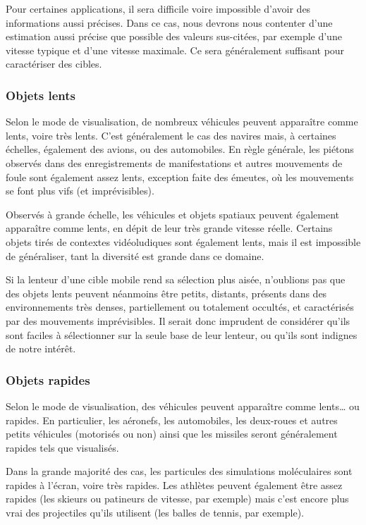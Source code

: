 	Pour certaines applications, il sera difficile voire impossible d'avoir des informations aussi précises. Dans ce cas, nous devrons nous contenter d'une estimation aussi précise que possible des valeurs sus-citées, par exemple d'une vitesse \og typique \fg{} et d'une vitesse maximale. Ce sera généralement suffisant pour caractériser des cibles.
				
	\subsubsection{Objets lents}
	Selon le mode de visualisation, de nombreux véhicules peuvent apparaître comme lents, voire très lents. C'est généralement le cas des navires mais, à certaines échelles, également des avions, ou des automobiles. En règle générale, les piétons observés dans des enregistrements de manifestations et autres mouvements de foule sont également assez lents, exception faite des émeutes, où les mouvements se font plus vifs (et imprévisibles).
	
	Observés à grande échelle, les véhicules et objets spatiaux peuvent également apparaître comme lents, en dépit de leur très grande vitesse réelle. Certains objets tirés de contextes vidéoludiques sont également lents, mais il est impossible de généraliser, tant la diversité est grande dans ce domaine.
	
	Si la lenteur d'une cible mobile rend sa sélection plus aisée, n'oublions pas que des objets lents peuvent néanmoins être petits, distants, présents dans des environnements très denses, partiellement ou totalement occultés, et caractérisés par des mouvements imprévisibles. Il serait donc imprudent de considérer qu'ils sont \og faciles \fg{} à sélectionner sur la seule base de leur lenteur, ou qu'ils sont indignes de notre intérêt.
	
	\subsubsection{Objets rapides}
	Selon le mode de visualisation, des véhicules peuvent apparaître comme lents\ldots{} ou rapides. En particulier, les aéronefs, les automobiles, les deux-roues et autres petits véhicules (motorisés ou non) ainsi que les missiles seront généralement rapides tels que visualisés.
	
	Dans la grande majorité des cas, les particules des simulations moléculaires sont rapides à l'écran, voire très rapides. Les athlètes peuvent également être assez rapides (les skieurs ou patineurs de vitesse, par exemple) mais c'est encore plus vrai des projectiles qu'ils utilisent (les balles de tennis, par exemple).
	
